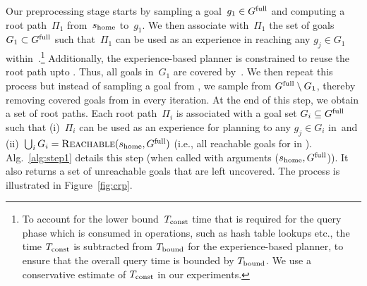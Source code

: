 \documentclass[a4paper]{report}
\begin{document}
Our preprocessing stage starts by sampling a goal~$g_1 \in G^{\textrm{full}}$ and computing a root path~$\Pi_1$ from~$s_{\textrm{home}}$ to~$g_1$. We then associate with~$\Pi_1$ the set of goals ~$G_1 \subset G^{\textrm{full}}$ such that~$\Pi_1$ can be used as an experience in reaching any $g_j \in G_1$ within~\Tbound.\footnote{To account for the lower bound~$T_{\textrm{const}}$ time that is required for the query phase which is consumed in operations, such as hash table lookups etc., the time $T_{\textrm{const}}$ is subtracted from $T_{\textrm{bound}}$ for the experience-based planner, to ensure that the overall query time is bounded by $T_{\textrm{bound}}$. We use a conservative estimate of $T_{\textrm{const}}$ in our experiments.}
Additionally, the experience-based planner is constrained to reuse the root path upto \Trc.
Thus, all goals in~$G_1$ are covered by~\Shome.
%
We then repeat this process but instead of sampling a goal from \Gfull, we sample from $G^{\textrm{full}} \setminus G_1$, thereby removing covered goals from \Gfull in every iteration.
At the end of this step, we obtain a set of root paths. 
Each root path~$\Pi_i$ is associated with a goal set $G_i \subseteq G^{\textrm{full}}$ such that 
(i)~$\Pi_i$ can be used as an experience for planning to any $g_j \in G_i$ in~\Tbound and 
(ii)~$\bigcup_i G_i = \textsc{Reachable}(s_{\textrm{home}}, G^{\textrm{full}})$ (i.e., all reachable goals for \Shome in \Gfull).
%
Alg.~\ref{alg:step1} details this step (when called with arguments ($s_{\textrm{home}},G^{\textrm{full}}$)). It also returns a set of unreachable goals that are left uncovered.
The process is illustrated in Figure~\ref{fig:crp}.
\end{document}
